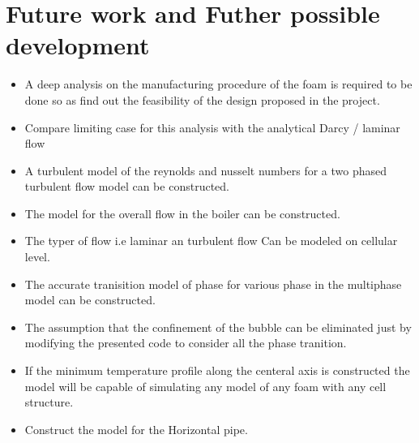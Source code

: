 \documentclass[compileTAMUreport.tex]{subfiles}
\begin{document}
\section{Future work and Futher possible development}
\begin{itemize}
\item A deep analysis on the manufacturing procedure of the foam is required to be done so as find out the feasibility of the design proposed in the project.

\item Compare limiting case for this analysis with the analytical Darcy / laminar flow 


\item A turbulent model of the reynolds and nusselt numbers for a two phased turbulent flow model can be constructed.

\item The model for the overall flow in the boiler can be constructed.

\item The typer of flow i.e laminar an turbulent flow Can be modeled on cellular level. 

\item The accurate tranisition model of phase for various phase in the multiphase model can be constructed.

\item The assumption that the confinement of the bubble can be eliminated just by modifying the presented code to consider all the phase tranition.

\item If the minimum temperature profile along the centeral axis is constructed the model will be capable of simulating any model of any foam with any cell structure. 

\item Construct the model for the Horizontal pipe.
\end{itemize}
\end{document}

